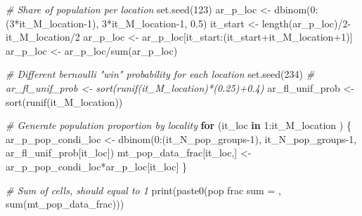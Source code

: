 \documentclass[
]{book}
\newenvironment{Shaded}{\begin{snugshade}}{\end{snugshade}}
\newcommand{\CommentTok}[1]{\textcolor[rgb]{0.56,0.35,0.01}{\textit{#1}}}
\newcommand{\ControlFlowTok}[1]{\textcolor[rgb]{0.13,0.29,0.53}{\textbf{#1}}}
\newcommand{\DecValTok}[1]{\textcolor[rgb]{0.00,0.00,0.81}{#1}}
\newcommand{\FloatTok}[1]{\textcolor[rgb]{0.00,0.00,0.81}{#1}}
\newcommand{\FunctionTok}[1]{\textcolor[rgb]{0.00,0.00,0.00}{#1}}
\newcommand{\NormalTok}[1]{#1}
\newcommand{\OtherTok}[1]{\textcolor[rgb]{0.56,0.35,0.01}{#1}}
\newcommand{\SpecialCharTok}[1]{\textcolor[rgb]{0.00,0.00,0.00}{#1}}
\newcommand{\StringTok}[1]{\textcolor[rgb]{0.31,0.60,0.02}{#1}}
\begin{document}
\begin{Shaded}
\begin{Highlighting}[]
\CommentTok{\# Share of population per location}
\FunctionTok{set.seed}\NormalTok{(}\DecValTok{123}\NormalTok{)}
\NormalTok{ar\_p\_loc }\OtherTok{\textless{}{-}} \FunctionTok{dbinom}\NormalTok{(}\DecValTok{0}\SpecialCharTok{:}\NormalTok{(}\DecValTok{3}\SpecialCharTok{*}\NormalTok{it\_M\_location}\DecValTok{{-}1}\NormalTok{), }\DecValTok{3}\SpecialCharTok{*}\NormalTok{it\_M\_location}\DecValTok{{-}1}\NormalTok{, }\FloatTok{0.5}\NormalTok{)}
\NormalTok{it\_start }\OtherTok{\textless{}{-}} \FunctionTok{length}\NormalTok{(ar\_p\_loc)}\SpecialCharTok{/}\DecValTok{2}\SpecialCharTok{{-}}\NormalTok{it\_M\_location}\SpecialCharTok{/}\DecValTok{2}
\NormalTok{ar\_p\_loc }\OtherTok{\textless{}{-}}\NormalTok{ ar\_p\_loc[it\_start}\SpecialCharTok{:}\NormalTok{(it\_start}\SpecialCharTok{+}\NormalTok{it\_M\_location}\SpecialCharTok{+}\DecValTok{1}\NormalTok{)]}
\NormalTok{ar\_p\_loc }\OtherTok{\textless{}{-}}\NormalTok{ ar\_p\_loc}\SpecialCharTok{/}\FunctionTok{sum}\NormalTok{(ar\_p\_loc)}

\CommentTok{\# Different bernoulli "win" probability for each location}
\FunctionTok{set.seed}\NormalTok{(}\DecValTok{234}\NormalTok{)}
\CommentTok{\# ar\_fl\_unif\_prob \textless{}{-} sort(runif(it\_M\_location)*(0.25)+0.4)}
\NormalTok{ar\_fl\_unif\_prob }\OtherTok{\textless{}{-}} \FunctionTok{sort}\NormalTok{(}\FunctionTok{runif}\NormalTok{(it\_M\_location))}

\CommentTok{\# Generate population proportion by locality}
\ControlFlowTok{for}\NormalTok{ (it\_loc }\ControlFlowTok{in} \DecValTok{1}\SpecialCharTok{:}\NormalTok{it\_M\_location ) \{}
\NormalTok{  ar\_p\_pop\_condi\_loc }\OtherTok{\textless{}{-}} \FunctionTok{dbinom}\NormalTok{(}\DecValTok{0}\SpecialCharTok{:}\NormalTok{(it\_N\_pop\_groups}\DecValTok{{-}1}\NormalTok{), it\_N\_pop\_groups}\DecValTok{{-}1}\NormalTok{, ar\_fl\_unif\_prob[it\_loc])}
\NormalTok{  mt\_pop\_data\_frac[it\_loc,] }\OtherTok{\textless{}{-}}\NormalTok{ ar\_p\_pop\_condi\_loc}\SpecialCharTok{*}\NormalTok{ar\_p\_loc[it\_loc]}
\NormalTok{\}}

\CommentTok{\# Sum of cells, should equal to 1}
\FunctionTok{print}\NormalTok{(}\FunctionTok{paste0}\NormalTok{(}\StringTok{\textquotesingle{}pop frac sum = \textquotesingle{}}\NormalTok{, }\FunctionTok{sum}\NormalTok{(mt\_pop\_data\_frac)))}
\end{Highlighting}
\end{Shaded}
\end{document}
